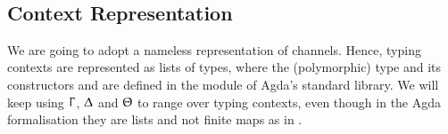 \begin{code}[hide]%
\>[0]\AgdaSymbol{\{-\#}\AgdaSpace{}%
\AgdaSpace{}%
\AgdaSpace{}%
\AgdaSymbol{\#-\}}\<%
\\
\>[0]\AgdaSpace{}%
\AgdaSpace{}%
\AgdaSpace{}%
\AgdaSpace{}%
\AgdaSymbol{(}\AgdaSymbol{;}\AgdaSpace{}%
\AgdaOperator{\AgdaInductiveConstructor{\AgdaUnderscore{},\AgdaUnderscore{}}}\AgdaSymbol{;}\AgdaSpace{}%
\AgdaSymbol{;}\AgdaSpace{}%
\AgdaSymbol{)}\<%
\\
\>[0]\AgdaSpace{}%
\AgdaSpace{}%
\AgdaSpace{}%
\AgdaSpace{}%
\AgdaSymbol{(}\AgdaSymbol{;}\AgdaSpace{}%
\AgdaInductiveConstructor{[]}\AgdaSymbol{;}\AgdaSpace{}%
\AgdaSymbol{;}\AgdaSpace{}%
\AgdaOperator{\AgdaFunction{[\AgdaUnderscore{}]}}\AgdaSymbol{;}\AgdaSpace{}%
\AgdaOperator{\AgdaFunction{\AgdaUnderscore{}++\AgdaUnderscore{}}}\AgdaSymbol{)}\<%
\\
\>[0]\AgdaSpace{}%
\AgdaSpace{}%
\<%
\\
\>[0]\AgdaSpace{}%
\AgdaSpace{}%
\AgdaSpace{}%
\AgdaSpace{}%
\AgdaSymbol{(}\AgdaSymbol{;}\AgdaSpace{}%
\AgdaSymbol{;}\AgdaSpace{}%
\AgdaSymbol{)}\<%
\\
%
\\[\AgdaEmptyExtraSkip]%
\>[0]\AgdaSpace{}%
\AgdaSpace{}%
\<%
\end{code}

\subsection{Context Representation}
\label{sec:context-agda}

We are going to adopt a nameless representation of channels. Hence, typing
contexts are represented as lists of types, where the (polymorphic) type
 and its constructors \AgdaInductiveConstructor{[]} and
 are defined in the module
 of Agda's standard library. We will keep using
$\Upgamma$, $\Updelta$ and $\Uptheta$ to range over typing contexts, even
though in the Agda formalisation they are lists and not finite maps as in
.

